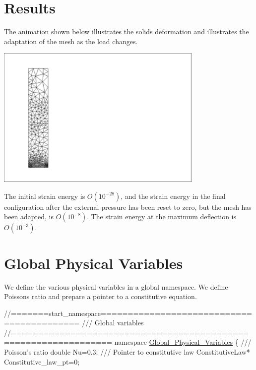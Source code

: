  

\hypertarget{index_results}{}\section{Results}\label{index_results}
The animation shown below illustrates the solid\textquotesingle{}s deformation and illustrates the adaptation of the mesh as the load changes.

 
\begin{DoxyImage}
\includegraphics[width=0.75\textwidth]{solid_res}
\end{DoxyImage}


The initial strain energy is $ O(10^{-28}) $, and the strain energy in the final configuration after the external pressure has been reset to zero, but the mesh has been adapted, is $ O(10^{-8}) $. The strain energy at the maximum deflection is $ O(10^{-3}) $.



 

\hypertarget{index_namespace}{}\section{Global Physical Variables}\label{index_namespace}
We define the various physical variables in a global namespace. We define Poisson\textquotesingle{}s ratio and prepare a pointer to a constitutive equation.

 
\begin{DoxyCodeInclude}
\textcolor{comment}{//=======start\_namespace==========================================}
\textcolor{comment}{/// Global variables}
\textcolor{comment}{}\textcolor{comment}{//================================================================}
\textcolor{keyword}{namespace }\hyperlink{namespaceGlobal__Physical__Variables}{Global\_Physical\_Variables}
\{\textcolor{comment}{}
\textcolor{comment}{ /// Poisson's ratio}
\textcolor{comment}{} \textcolor{keywordtype}{double} Nu=0.3;
\textcolor{comment}{}
\textcolor{comment}{ /// Pointer to constitutive law}
\textcolor{comment}{} ConstitutiveLaw* Constitutive\_law\_pt=0;

\end{DoxyCodeInclude}


